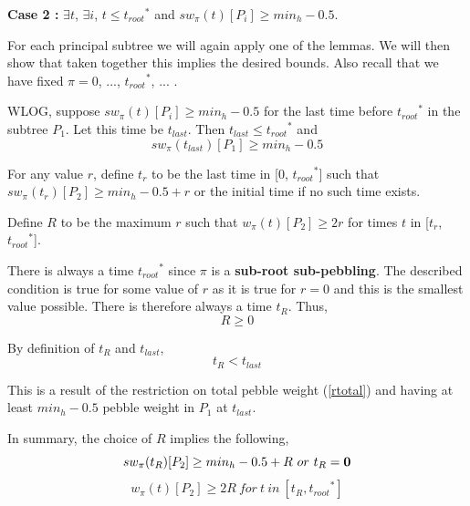 \documentclass[oribib1]{llncs}
\newcommand{\troots}{{t_{root}}^*}
\begin{document}
\noindent
{\bf Case 2 :}  $\exists t$, $\exists i$, $t \le \troots$ and $sw_{\pi}(t)[P_i] \geq min_h-0.5$.

For each principal subtree we will again apply one of the lemmas. We will then show that taken together this implies the desired bounds. Also recall that we have fixed $\pi = 0$, ..., $\troots$, ... .

\medskip

WLOG, suppose $sw_{\pi}(t)[P_i] \geq min_h-0.5$ for the last time before $\troots$ in the subtree $P_1$. Let this time be $t_{last}$. Then $t_{last} \leq \troots$ and 
\begin{equation} sw_{\pi}(t_{last})[P_1] \geq min_h-0.5\label{swp2tlast}\end{equation}

For any value $r$, define $t_{r}$ to be the last time in [0, $\troots$] such that  $sw_{\pi}(t_{r})[P_2]  \geq min_h-0.5+r$ or the initial time if no such time exists.

Define $R$ to be the maximum $r$ such that $w_{\pi}(t)[P_2] \geq 2{r}$ for times $t$ in [$t_{r}$, $\troots$].

\medskip


There is always a time $\troots$ since $\pi$ is a {\bf sub-root sub-pebbling}. The described condition is true for some value of $r$ as it is true for $r = 0$ and this is the smallest value possible. There is therefore always a time $t_{R}$. Thus,
\begin{equation} {R} \geq 0\label{DboundsC1A}\end{equation}

By definition of $t_{R}$ and $t_{last}$, 
\begin{equation} t_{R} < t_{last}\label{tdtlast}\end{equation}


This is a result of the restriction on total pebble weight (\ref{rtotal}) and having at least $min_h-0.5$ pebble weight in $P_1$ at $t_{last}$.

\medskip


In summary, the choice of ${R}$ implies the following, 
\begin{equation}sw_{\pi}(t_{R})[P_2]  \geq min_h-0.5+{R}~or~t_{R} = {\bf 0}\label{tdamt}\end{equation}
\begin{equation}w_{\pi}(t)[P_2] \geq 2{R}~for~t~in~[t_{R}, \troots]\label{tdres}\end{equation}
\end{document}
